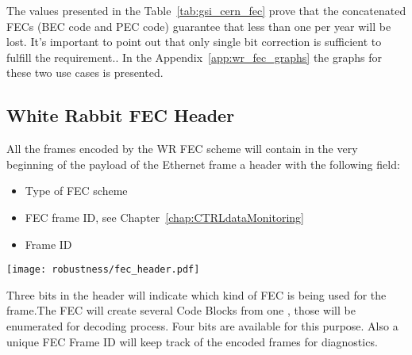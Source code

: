 The values presented in the Table~\ref{tab:gsi_cern_fec} prove that the
concatenated FECs (BEC code and PEC code) guarantee that less than one
\ControlMessage per year will be lost. It's important to point out that only
single bit correction is sufficient to fulfill the requirement..
In the Appendix~\ref{app:wr_fec_graphs} the graphs for these two use
cases is presented.

\subsection{White Rabbit FEC Header}

All the frames encoded by the WR FEC scheme will contain in the very beginning
of the payload of the Ethernet frame a header with the following field:

\begin{itemize}
	\item Type of FEC scheme
	\item FEC frame ID, see Chapter~\ref{chap:CTRLdataMonitoring}
	\item Frame ID
\end{itemize}

\begin{center}
        \texttt{[image: robustness/fec\_header.pdf]}
         \label{fig:fec_header}
\end{center}

Three bits in the header will indicate which kind of FEC is being used for the
frame.The FEC will create several Code Blocks from one \ControlMessage, those
will be enumerated for decoding process. Four bits are available for this
purpose. Also a unique FEC Frame ID will keep track of the encoded frames for
diagnostics.






